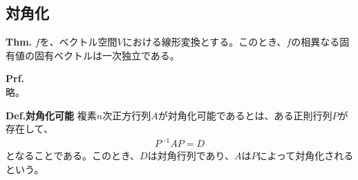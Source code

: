 \documentclass[a4paper,11pt]{jsarticle}
\numberwithin{equation}{section}
\begin{document}
\subsection{対角化}
\begin{itembox}[l]{\textbf{Thm.}}
  $f$を、ベクトル空間$V$における線形変換とする。このとき、$f$の相異なる固有値の固有ベクトルは一次独立である。
\end{itembox}
\textbf{Prf.}\\
略。\hfill\qedsymbol\\

\begin{itembox}[l]{\textbf{Def.対角化可能}}
  複素$n$次正方行列$A$が対角化可能であるとは、ある正則行列$P$が存在して、
  \begin{align}
    P^{-1}AP = D
  \end{align}
  となることである。このとき、$D$は対角行列であり、$A$は$P$によって対角化されるという。
\end{itembox}
\end{document}
